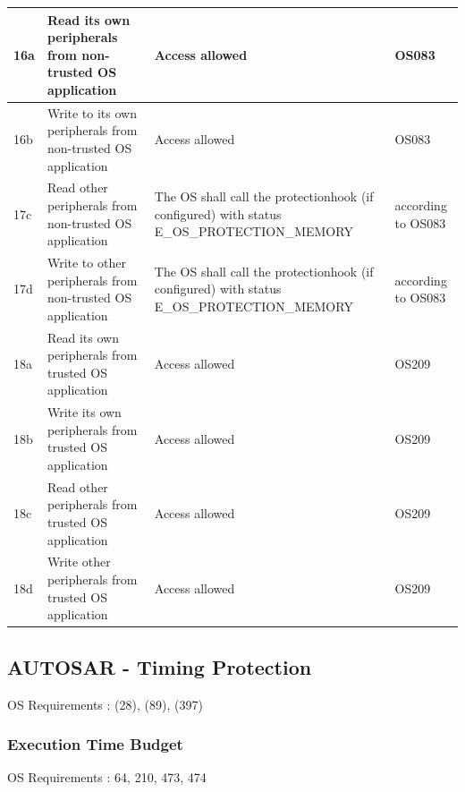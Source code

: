 \documentclass[10pt]{article}
\newlength{\Li}\settowidth{\Li}{Case}
\newlength{\Lii}\setlength{\Lii}{7cm}
\newlength{\Liii}\setlength{\Liii}{\textwidth} \addtolength{\Liii}{-\Li} \addtolength{\Liii}{-\Lii}
\newlength{\Liiii}\setlength{\Liiii}{\textwidth} \addtolength{\Liiii}{-\Li}
\begin{document}
\begin{supertabular}{|p{\Li}|p{\Lii}|p{\Liii}|p{\Liiii}|}
	16a 	& Read its own peripherals from non-trusted OS application				& Access allowed															& OS083 \\ \hline
	16b 	& Write to its own peripherals from non-trusted OS application				& Access allowed															& OS083 \\ \hline
	17c 	& Read other peripherals from non-trusted OS application			& The OS shall call the protectionhook (if configured) with status E\_OS\_PROTECTION\_MEMORY	& according to OS083 \\ \hline
	17d 	& Write to other peripherals from non-trusted OS application			& The OS shall call the protectionhook (if configured) with status E\_OS\_PROTECTION\_MEMORY	& according to OS083 \\ \hline
	18a 	& Read its own peripherals from trusted OS application					& Access allowed															& OS209 \\ \hline
	18b 	& Write its own peripherals from trusted OS application					& Access allowed															& OS209 \\ \hline
	18c 	& Read other peripherals from trusted OS application					& Access allowed															& OS209 \\ \hline
	18d 	& Write other peripherals from trusted OS application					& Access allowed															& OS209 \\ \hline
	\end{supertabular}
	
	\subsection{AUTOSAR - Timing Protection}
	OS Requirements : (28), (89), (397)\\
	
	\subsubsection{Execution Time Budget}
	OS Requirements : 64, 210, 473, 474\\
	
\end{document}

